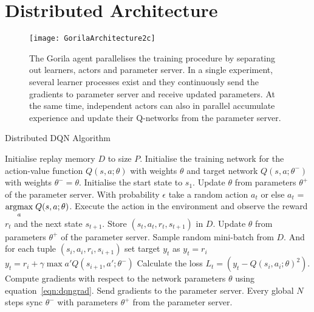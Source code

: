 \documentclass{article}
\begin{document}
 \section{Distributed Architecture}

\begin{figure*}[ht]
\begin{center}
		\centerline{\texttt{[image: GorilaArchitecture2c]}}
		\caption{The Gorila agent parallelises the training procedure by separating out learners, actors and parameter server. In a single experiment, several learner processes exist and they continuously send the gradients to parameter server and receive updated parameters. At the same time, independent actors can also in parallel accumulate experience and update their Q-networks from the parameter server. }
		\label{Gorila-figure}
	\end{center}
	\vskip -0.2in
\end{figure*}

\begin{algorithm}[t]
	\caption{Distributed DQN Algorithm}
	\label{alg:DistDQNAlgo}
	\begin{algorithmic}
		\STATE Initialise replay memory $D$ to size $P$.
		\STATE Initialise the training network for the action-value function $Q(s,a;\theta)$ with weights $\theta$ and target network $Q(s,a;\theta^-)$ with weights $\theta^- = \theta$.
		\STATE Initialise the start state to $s_{1}$.
		\STATE Update $\theta$ from parameters $\theta^+$ of the parameter server.
		\STATE With probability $\epsilon$ take a random action $a_{t}$ or else $a_{t}$ = $\underset{a}{\operatorname{argmax}}\;{Q(s, a ;\theta)}$.
		\STATE Execute the action in the environment and observe the reward $r_t$ and the next state $s_{t+1}$. Store $(s_t,a_t,r_t,s_{t+1})$ in $D$.
		\STATE Update $\theta$ from parameters $\theta^+$ of the parameter server.
		\STATE Sample random mini-batch from $D$. And for each tuple $(s_i,a_i,r_i,s_{i+1})$ set target $y_t$ as
		\STATE $y_t = r_i$
		\ELSE
		\STATE $y_t = r_i + \gamma \max{a'}{Q(s_{i+1}, a' ; \theta^{-})}$
		\ENDIF
		\STATE Calculate the loss $L_t = (y_t - Q(s_i, a_i ; \theta)^2)$.
		\STATE Compute gradients with respect to the network parameters $\theta$ using equation~\ref{eqn:dqngrad}.
		\STATE Send gradients to the parameter server.
		\STATE Every global $N$ steps sync $\theta^{-}$ with parameters $\theta^+$ from the parameter server.
		\ENDFOR
		\ENDFOR
	\end{algorithmic}
\end{algorithm}
\end{document}
